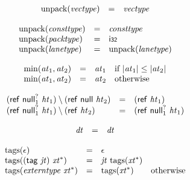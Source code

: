 $$
\begin{array}[t]{@{}lcl@{}l@{}}
{\mathrm{unpack}}({\mathit{vectype}}) & = & {\mathit{vectype}} \\
\end{array}
$$

$$
\begin{array}[t]{@{}lcl@{}l@{}}
{\mathrm{unpack}}({\mathit{consttype}}) & = & {\mathit{consttype}} \\
{\mathrm{unpack}}({\mathit{packtype}}) & = & \mathsf{i{\scriptstyle 32}} \\
{\mathrm{unpack}}({\mathit{lanetype}}) & = & {\mathrm{unpack}}({\mathit{lanetype}}) \\
\end{array}
$$

\vspace{1ex}

$$
\begin{array}[t]{@{}lcl@{}l@{}}
{\mathrm{min}}({\mathit{at}}_1, {\mathit{at}}_2) & = & {\mathit{at}}_1 & \quad \mbox{if}~ {|{\mathit{at}}_1|} \leq {|{\mathit{at}}_2|} \\
{\mathrm{min}}({\mathit{at}}_1, {\mathit{at}}_2) & = & {\mathit{at}}_2 & \quad \mbox{otherwise} \\
\end{array}
$$

$$
\begin{array}[t]{@{}lcl@{}l@{}}
(\mathsf{ref}~{{\mathsf{null}}_1^?}~{\mathit{ht}}_1) \setminus (\mathsf{ref}~\mathsf{null}~{\mathit{ht}}_2) & = & (\mathsf{ref}~{\mathit{ht}}_1) \\
(\mathsf{ref}~{{\mathsf{null}}_1^?}~{\mathit{ht}}_1) \setminus (\mathsf{ref}~{\mathit{ht}}_2) & = & (\mathsf{ref}~{{\mathsf{null}}_1^?}~{\mathit{ht}}_1) \\
\end{array}
$$

$$
\begin{array}[t]{@{}lcl@{}l@{}}
{\mathit{dt}} & = & {\mathit{dt}} \\
\end{array}
$$

\vspace{1ex}

\vspace{1ex}

$$
\begin{array}[t]{@{}lcl@{}l@{}}
{\mathrm{tags}}(\epsilon) & = & \epsilon \\
{\mathrm{tags}}((\mathsf{tag}~{\mathit{jt}})~{{\mathit{xt}}^\ast}) & = & {\mathit{jt}}~{\mathrm{tags}}({{\mathit{xt}}^\ast}) \\
{\mathrm{tags}}({\mathit{externtype}}~{{\mathit{xt}}^\ast}) & = & {\mathrm{tags}}({{\mathit{xt}}^\ast}) & \quad \mbox{otherwise} \\
\end{array}
$$

